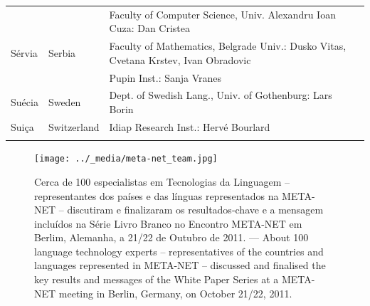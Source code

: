 \begin{longtable}{llp{105mm}}
  & & Faculty of Computer Science, Univ. Alexandru Ioan Cuza: Dan Cristea \\ \addlinespace
  Sérvia & \textcolor{grey1}{Serbia} & Faculty of Mathematics, Belgrade Univ.: Dusko Vitas, Cvetana Krstev, Ivan Obradovic \\ \addlinespace
  & & Pupin Inst.: Sanja Vranes \\ \addlinespace  
  Suécia & \textcolor{grey1}{Sweden} & Dept. of Swedish Lang., Univ. of Gothenburg: Lars Borin \\ \addlinespace 
  Suiça & \textcolor{grey1}{Switzerland} & Idiap Research Inst.: Hervé Bourlard \\ \addlinespace 
\end{longtable}
\normalsize

\renewcommand*{\figureformat}{}
\renewcommand*{\captionformat}{}

\begin{figure}[htbp]
  \center
  \texttt{[image: ../\_media/meta-net\_team.jpg]}   \caption{Cerca de 100 especialistas em Tecnologias da Linguagem -- representantes dos países e das línguas representados na META-NET -- discutiram e finalizaram os resultados-chave e a mensagem incluídos na Série Livro Branco no Encontro META-NET em Berlim, Alemanha, a 21/22 de Ou\-tu\-bro de 2011. --- \textcolor{grey1}{About 100 language technology experts -- representatives of the countries and languages represented in META-NET -- discussed and finalised the key results and messages of the White Paper Series at a META-NET meeting in Berlin, Germany, on October 21/22, 2011.}}
  \medskip
\end{figure}

\cleardoublepage

\label{whitepaperseries}

